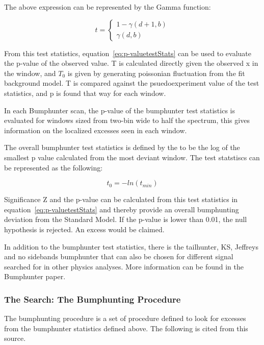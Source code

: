     The above expression can be represented by the Gamma function: 

	\begin{equation}
    t=
	\begin{cases} 1-\gamma(d+1, b)%
    \\
    \gamma(d,b)%
    \end{cases}
    \end{equation}
    


    From this test statistics, equation~\ref{eq:p-valuetestStats} can be used to evaluate the p-value of the observed value. T is calculated directly given the observed x in the window, and $T_{0}$ is given by generating poissonian fluctuation from the fit background model. T is compared against the psuedoexperiment value of the test statistics, and p is found that way for each window. 

    In each Bumphunter scan, the p-value of the bumphunter test statistics is evaluated for windows sized from two-bin wide to half the spectrum, this gives information on the localized excesses seen in each window.

    The overall bumphunter test statistics is defined by the to be the log of the smallest p value calculated from the most deviant window. The test statstiscs can be represented as the following:

    \begin{equation}
        t_{0} = - ln (t_{min}) 
    \end{equation}

    Significance Z and the p-value can be calculated from this test statistics in equation~\ref{eq:p-valuetestStats} and thereby provide an overall bumphunting deviation from the Standard Model. If the p-value is lower than 0.01, the null hypothesis is rejected. An excess would be claimed. 

    In addition to the bumphunter test statistics, there is the tailhunter, KS, Jeffreys and no sidebands bumphunter that can also be chosen for different signal searched for in other physics analyses. More information can be found in the Bumphunter paper\cite{choudalakis2011hypothesis}.

    \subsubsection{The Search: The Bumphunting Procedure}
    The bumphunting procedure is a set of procedure defined to look for excesses from the bumphunter statistics defined above. The following is cited from this source\cite{Pachal:206032}.

